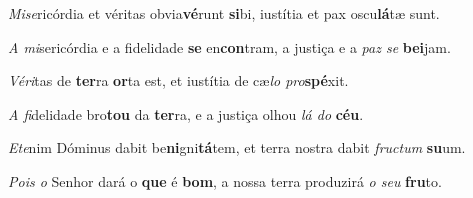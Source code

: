 \begin{greenumerate}
  \setcounter{enumi}{1}


  \item \textit{Mise}ricórdia et véritas obvia\textbf{vé}runt \textbf{si}bi, {\GreStar} iustítia et pax oscu\textbf{lá}tæ sunt. 

  \switchcolumn\setcounter{enumi}{1}

  \item \textit{A mi}sericórdia e a fidelidade \textbf{se} en\textbf{con}tram, {\GreStar} a justiça e a \textit{paz se} \textbf{bei}jam. 

  \switchcolumn*


  \item \textit{Véri}tas de \textbf{ter}ra \textbf{or}ta est, {\GreStar} et iustítia de cæ\textit{lo pro}\-\textbf{spé}\-xit. 

  \switchcolumn%

  \item \textit{A fi}delidade bro\textbf{tou} da \textbf{ter}ra, {\GreStar} e a justiça olhou \textit{lá do} \textbf{céu}. 

  \switchcolumn*


  \item \textit{Ete}nim Dóminus dabit be\textbf{ni}gni\textbf{tá}tem, {\GreStar} et terra nostra dabit \textit{fructum} \textbf{su}um. 

  \switchcolumn%

  \item \textit{Pois o} Senhor dará o \textbf{que} é \textbf{bom}, {\GreStar} a nossa terra produzirá \textit{o seu} \textbf{fru}to. 
\end{greenumerate}